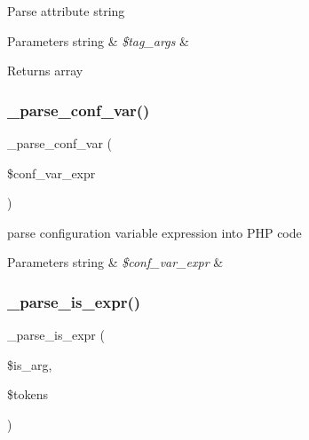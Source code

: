 Parse attribute string


\begin{DoxyParams}[1]{Parameters}
string & {\em \$tag\+\_\+args} & \\
\hline
\end{DoxyParams}
\begin{DoxyReturn}{Returns}
array 
\end{DoxyReturn}
\mbox{\label{class_smarty___compiler_a3887c9771f60165babae612a4595d1fc}} 
\subsubsection{\texorpdfstring{\+\_\+parse\+\_\+conf\+\_\+var()}{\_parse\_conf\_var()}}
{\footnotesize\ttfamily \+\_\+parse\+\_\+conf\+\_\+var (\begin{DoxyParamCaption}\item[{}]{\$conf\+\_\+var\+\_\+expr }\end{DoxyParamCaption})}

parse configuration variable expression into P\+HP code


\begin{DoxyParams}[1]{Parameters}
string & {\em \$conf\+\_\+var\+\_\+expr} & \\
\hline
\end{DoxyParams}
\mbox{\label{class_smarty___compiler_ad03b182e7b84d4a40218ae9b4f8080de}} 
\subsubsection{\texorpdfstring{\+\_\+parse\+\_\+is\+\_\+expr()}{\_parse\_is\_expr()}}
{\footnotesize\ttfamily \+\_\+parse\+\_\+is\+\_\+expr (\begin{DoxyParamCaption}\item[{}]{\$is\+\_\+arg,  }\item[{}]{\$tokens }\end{DoxyParamCaption})}

